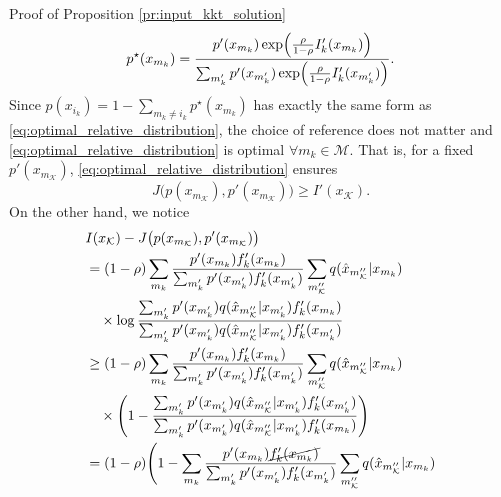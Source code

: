 \documentclass[journal]{IEEEtran}
\begin{document}
\begin{appendix}
\begin{subsection}{Proof of Proposition \ref{pr:input_kkt_solution}}
		\begin{equation}
			p^\star(x_{m_k}) = \frac{p'(x_{m_k}) \exp \Bigl( \frac{\rho}{1 - \rho} I_k'(x_{m_k}) \Bigr)}{\sum_{m_k'} p'(x_{m_k'}) \exp \Bigl( \frac{\rho}{1 - \rho} I_k'(x_{m_k'}) \Bigr)}.
			\label{eq:optimal_relative_distribution}
		\end{equation}
		Since $p(x_{i_k}) = 1 - \sum_{m_k \ne i_k} p^\star(x_{m_k})$ has exactly the same form as \eqref{eq:optimal_relative_distribution}, the choice of reference does not matter and \eqref{eq:optimal_relative_distribution} is optimal $\forall m_k \in \mathcal{M}$.
		That is, for a fixed $p'(x_{m_{\mathcal{K}}})$, \eqref{eq:optimal_relative_distribution} ensures
		\begin{equation}
			J \bigl( p(x_{m_{\mathcal{K}}}),p'(x_{m_{\mathcal{K}}}) \bigr) \ge I'(x_{\mathcal{K}}).
			\label{eq:information_difference_lower}
		\end{equation}
		On the other hand, we notice
		\begin{subequations}
			\allowdisplaybreaks
			\label{eq:information_difference_upper}
			\begin{align}
				 & I(x_{\mathcal{K}}) - J \bigl( p(x_{m_{\mathcal{K}}}),p'(x_{m_{\mathcal{K}}}) \bigr)                                                                                                                    \nonumber           \\
				 & = (1 - \rho) \sum_{m_k} \frac{p'(x_{m_k}) f_k'(x_{m_k})}{\sum_{m_k'} p'(x_{m_k'}) f_k'(x_{m_k'})} \sum_{m_{\mathcal{K}}''} q(\hat{x}_{m_{\mathcal{K}}''}|x_{m_k})                                      \nonumber           \\
				 & \quad \times \log \frac{\sum_{m_k'} p'(x_{m_k'}) q(\hat{x}_{m_{\mathcal{K}}''}|x_{m_k'}) f_k'(x_{m_k})}{\sum_{m_k'} p'(x_{m_k'}) q(\hat{x}_{m_{\mathcal{K}}''}|x_{m_k'}) f_k'(x_{m_k'})}                                   \\
				 & \ge (1 - \rho) \sum_{m_k} \frac{p'(x_{m_k}) f_k'(x_{m_k})}{\sum_{m_k'} p'(x_{m_k'}) f_k'(x_{m_k'})} \sum_{m_{\mathcal{K}}''} q(\hat{x}_{m_{\mathcal{K}}''}|x_{m_k})                                    \nonumber           \\
				 & \quad \times \Biggl( 1 - \frac{\sum_{m_k'} p'(x_{m_k'}) q(\hat{x}_{m_{\mathcal{K}}''}|x_{m_k'}) f_k'(x_{m_k'})}{\sum_{m_k'} p'(x_{m_k'}) q(\hat{x}_{m_{\mathcal{K}}''}|x_{m_k'}) f_k'(x_{m_k})} \Biggr)                    \\
				 & = (1 - \rho) \Biggl( 1 - \sum_{m_k} \frac{p'(x_{m_k}) \cancel{f_k'(x_{m_k})}}{\sum_{m_k'} p'(x_{m_k'}) f_k'(x_{m_k'})} \sum_{m_{\mathcal{K}}''} q(\hat{x}_{m_{\mathcal{K}}''}|x_{m_k})                 \nonumber           \\

\end{align}
\end{subequations}
\end{subsection}
\end{appendix}
\end{document}
